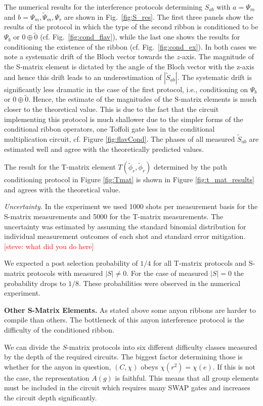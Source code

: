\documentclass[two column]{article}
\newcommand{\caro}[1]{\textcolor{red}{[#1]}}
\begin{document}
The numerical results for the interference protocols determining $S_{ab}$ with $a=\Psi_m$ and $b=\Psi_m,\tilde \Psi_m, \Psi_r$ are shown in Fig.~\ref{fig:S_res}. The first three panels show the results of the protocol in which the type of the second ribbon is conditioned to be $\Psi_b$ or $0 \oplus \tilde 0$ (cf. Fig.~\ref{fig:cond_flav}), while the last one shows the results for conditioning the existence of the ribbon (cf. Fig.~\ref{fig:cond_ex}). In both cases we note a systematic drift of the Bloch vector towards the $z$-axis. The magnitude of the S-matrix element is dictated by the angle of the Bloch vector with the z-axis and hence this drift leads to an underestimation of $|\tilde S_{ab}|$. The systematic drift is significantly less dramatic in the case of the first protocol, i.e., conditioning on $\Psi_b$ or $0 \oplus \tilde 0$.  Hence, the estimate of the magnitudes of the S-matrix elements is much closer to the theoretical value. 
 This is due to the fact that the circuit implementing this protocol is much shallower due to the simpler forms of the conditional ribbon operators, one Toffoli gate less in the conditional multiplication circuit, cf. Figure \ref{fig:flavCond}. The phases of all measured $\tilde S_{ab}$ are estimated well and agree with the theoretically predicted values.


The result for the T-matrix element $T(\tilde \phi_r, \tilde \phi_r)$ determined by the path conditioning protocol in Figure \ref{fig:Tmat} is shown in Figure \ref{fig:t_mat_results} and agrees with the theoretical value.



\emph{Uncertainty.} In the experiment we used 1000 shots per measurement basis for the S-matrix measurements and 5000 for the T-matrix measurements. The uncertainty was estimated by assuming the standard binomial distribution for individual measurement outcomes of each shot and standard error mitigation. \caro{steve: what did you do here}

We expected a post selection probability of $1/4$ for all T-matrix protocols and S-matrix protocols with measured $|S| \neq 0$. For the case of measured $|S| = 0$ the probability drops to $1/8$. These probabilities were observed in the numerical experiment.

\textbf{Other S-Matrix Elements.}
As stated above some anyon ribbons are harder to compile than others. The bottleneck of this anyon interference protocol is the difficulty of the conditioned ribbon. 

We can divide the $S$-matrix protocols into six different difficulty classes measured by the depth of the required circuits. The biggest factor determining those is whether for the anyon in question, $(C, \chi)$ obeys $\chi(r^2) = \chi(e)$. If this is not the case, the representation $A{(g)}$ is faithful. This means that all group elements must be included in the circuit which requires many SWAP gates and increases the circuit depth significantly.
\end{document}
